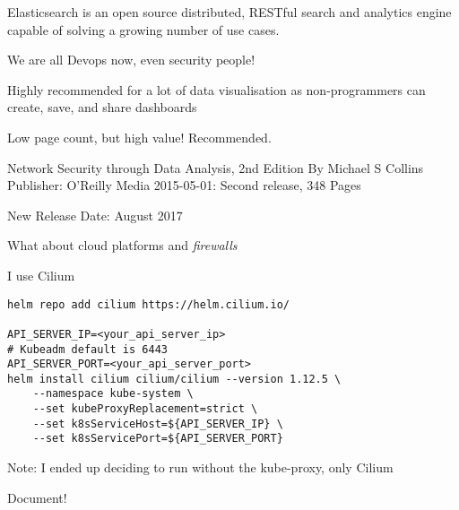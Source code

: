 \documentclass[Screen16to9,17pt]{foils}
\begin{document}


Elasticsearch is an open source distributed, RESTful search and analytics engine capable of solving a growing number of use cases.


\centerline{We are all Devops now, even security people!}

Highly recommended for a lot of data visualisation as non-programmers can create, save, and share dashboards




Low page count, but high value! Recommended.

Network Security through Data Analysis, 2nd Edition
By Michael S Collins
Publisher: O'Reilly Media
2015-05-01: Second release, 348 Pages

New Release Date: August 2017



What about cloud platforms and \emph{firewalls}

I use Cilium

\begin{verbatim}
helm repo add cilium https://helm.cilium.io/

API_SERVER_IP=<your_api_server_ip>
# Kubeadm default is 6443
API_SERVER_PORT=<your_api_server_port>
helm install cilium cilium/cilium --version 1.12.5 \
    --namespace kube-system \
    --set kubeProxyReplacement=strict \
    --set k8sServiceHost=${API_SERVER_IP} \
    --set k8sServicePort=${API_SERVER_PORT}
\end{verbatim}

\begin{list2}
\item Note: I ended up deciding to run without the kube-proxy, only Cilium
\item Document!
\end{list2}



\end{document}
